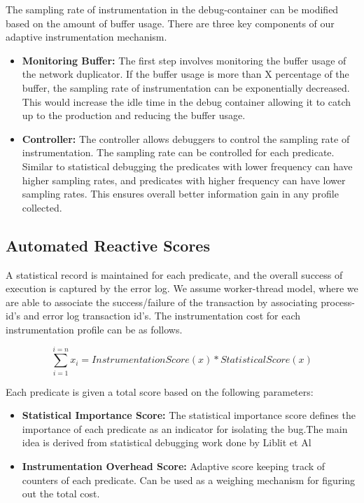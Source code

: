 The sampling rate of instrumentation in the debug-container can be modified based on the amount of buffer usage.
There are three key components of our adaptive instrumentation mechanism.

\begin{itemize}
	\item \textbf{Monitoring Buffer:}
	The first step involves monitoring the buffer usage of the network duplicator. 
	If the buffer usage is more than X percentage of the buffer, the sampling rate of instrumentation can be exponentially decreased.
	This would increase the idle time in the debug container allowing it to catch up to the production and reducing the buffer usage.
	
	\item \textbf{Controller:}
	The controller allows debuggers to control the sampling rate of instrumentation.
	The sampling rate can be controlled for each predicate.
	Similar to statistical debugging the predicates with lower frequency can have higher sampling rates, and predicates with higher frequency can have lower sampling rates. This ensures overall better information gain in any profile collected.  	
	
\end{itemize}

\subsection{Automated Reactive Scores}

A statistical record is maintained for each predicate, and the overall success of execution is captured by the error log.
We assume worker-thread model, where we are able to associate the success/failure of the transaction by associating process-id’s and error log transaction id’s.
The instrumentation cost for each instrumentation profile can be as follows.

\begin{equation}
\sum\limits_{i=1}^{i=n} x_i  = InstrumentationScore(x)*StatisticalScore(x)
\end{equation}

Each predicate is given a total score based on the following parameters:

\begin{itemize}
	\item \textbf{Statistical Importance Score:} The statistical importance score defines the importance of each predicate as an indicator for isolating the bug.The main idea is derived from statistical debugging work done by Liblit et Al
	\item \textbf{Instrumentation Overhead Score:} Adaptive score keeping track of counters of each predicate. Can be used as a weighing mechanism for figuring out the total cost.
\end{itemize}


